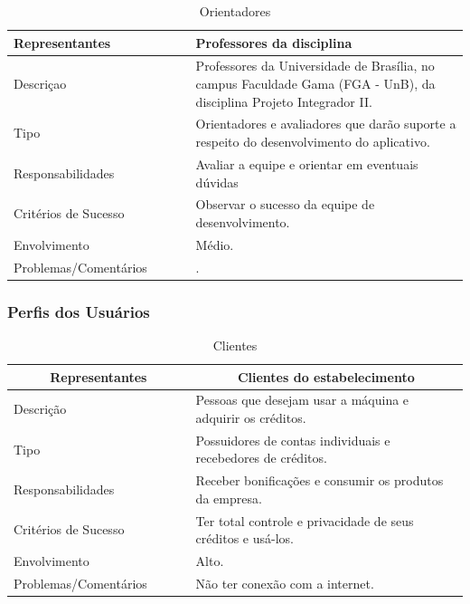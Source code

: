 \begin{table}[htp]
    \centering
    \caption{Orientadores}
    \label{my-label}
    \begin{tabular}{|p{0.40\linewidth}|p{0.60\linewidth}|}
        \hline
        Representantes    & Professores da disciplina \\ \hline
        Descriçao    & Professores da Universidade de Brasília, no campus Faculdade Gama (FGA - UnB), da disciplina Projeto Integrador II. \\ \hline
        Tipo    & Orientadores e avaliadores que darão suporte a respeito do desenvolvimento do aplicativo. \\ \hline
        Responsabilidades    & Avaliar a equipe e orientar em eventuais dúvidas \\ \hline
        Critérios de Sucesso    & Observar o sucesso da equipe de desenvolvimento. \\ \hline
        Envolvimento    & Médio. \\ \hline
        Problemas/Comentários    & . \\ \hline
    \end{tabular}
\end{table}

\subsubsection{Perfis dos Usuários}


\begin{table}[htp]
    \centering
    \caption{Clientes}
    \label{my-label}
    \begin{tabular}{|p{0.40\linewidth}|p{0.60\linewidth}|}
        \hline
        \multicolumn{1}{|c|}{\textbf{Representantes}} & \multicolumn{1}{c|}{\textbf{Clientes do estabelecimento}} \\ \hline
        Descrição    & Pessoas que desejam usar a máquina e adquirir os créditos. \\ \hline
        Tipo    & Possuidores de contas individuais e recebedores de créditos. \\ \hline
        Responsabilidades    & Receber bonificações e consumir os produtos da empresa. \\ \hline
        Critérios de Sucesso    & Ter total controle e privacidade de seus créditos e usá-los. \\ \hline
        Envolvimento    & Alto. \\ \hline
        Problemas/Comentários    & Não ter conexão com a internet. \\ \hline
    \end{tabular}
\end{table}

